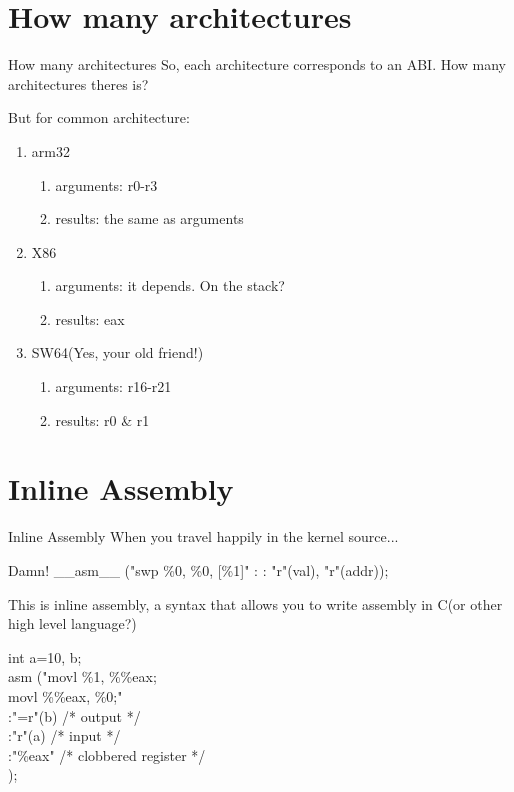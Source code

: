 \documentclass[UKenglish]{beamer}
\begin{document}
\section{How many architectures}
\begin{frame}{How many architectures}
  So, each architecture corresponds to an ABI. How many architectures theres is?

  \begin{center}
    \color{red}{Well, Of course, I don't know ;-)}
  \end{center}

  But for common architecture:
  \begin{enumerate}
  \item arm32
    \begin{enumerate}
    \item arguments: r0-r3
    \item results: the same as arguments
    \end{enumerate}
  \item X86
    \begin{enumerate}
    \item arguments: it depends. On the stack?
    \item results: eax
    \end{enumerate}
  \item SW64(Yes, your old friend!)
    \begin{enumerate}
    \item arguments: r16-r21
    \item results: r0 \& r1
    \end{enumerate}
  \end{enumerate}
\end{frame}

\section{Inline Assembly}
\begin{frame}{Inline Assembly}
  When you travel happily in the kernel source...
  \begin{alertblock}{Damn!}
    \_\_asm\_\_ ("swp \%0, \%0, [\%1]" : : "r"(val), "r"(addr));
  \end{alertblock}
  This is inline assembly, a syntax that allows you to write assembly in C(or other high
  level language?)
  \begin{center}
    \begin{example}
       int a=10, b;\\
        asm ("movl \%1, \%\%eax; \\
              movl \%\%eax, \%0;"\\
             :"=r"(b)        /* output */\\
             :"r"(a)         /* input */\\
             :"\%eax"         /* clobbered register */\\
             );  
    \end{example}
  \end{center}
  
\end{frame}
\end{document}

